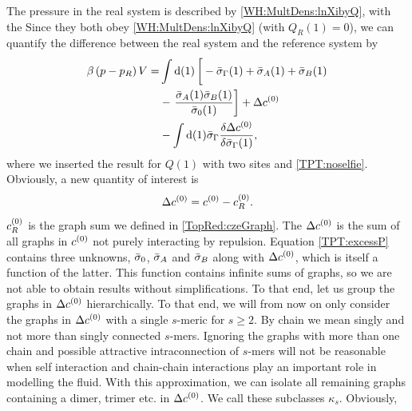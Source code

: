 \documentclass[8.5pt,twoside,twocolumn]{article}
\newcommand\di{\te{d}}
\newcommand\cze{\enmat{c^{(0)}}}
\newcommand\inon{\enmat{\int\di(1)}}
\theoremstyle{standard}
\begin{document}
The pressure in the real system is described by \eqref{WH:MultDens:lnXibyQ}, with the  
Since they both obey \eqref{WH:MultDens:lnXibyQ} (with $Q_R(1)=0$), we can quantify the difference
between the real system and the reference system by
\begin{equation}
\begin{aligned}
\be \rb{p-p_R}V =& \inon \lt[\vphantom{\frac 1 2}-\siga(1)+\si_A(1)+\si_B(1)\rt.\\
&-\lt.\frac{\si_A(1)\si_B(1)}{\siz(1)}\rt] + \Dl\cze \\
&- \inon\siga\delti{\Dl\cze}{\siga(1)},
\end{aligned}
\label{TPT:excessP}
\end{equation}
where we inserted the result for $Q(1)$ with two sites and \eqref{TPT:noselfie}. Obviously, a new
quantity of interest is
\newcommand\chs{\enmat{\cze_{R}}}
\newcommand\dc{\enmat{\Dl\cze}}
\newcommand\dcs{\enmat{\dc[s]}}
\begin{equation}
\dc=\cze-\chs.
\end{equation}
$\chs$ is the graph sum we defined in \eqref{TopRed:czeGraph}. The $\Dl\cze$ is the sum of all
graphs in $\cze$ not purely interacting by repulsion. Equation \eqref{TPT:excessP} contains
three unknowns, $\bar\sigma_0$, $\bar\sigma_A$ and $\bar\sigma_B$ along with $\dc$, which is itself a function
of the latter. This function contains infinite sums of graphs, so we are not able to obtain
results without simplifications. To that end, let us group the graphs in $\dc$
hierarchically. To that end, we will from now on only consider the graphs in
$\dc$ with a single $s$-meric  for $s\ge2$. By chain we mean singly
and not more than singly connected $s$-mers. Ignoring the graphs with more than one
chain and possible attractive intraconnection of $s$-mers will not be reasonable
when self interaction and chain-chain interactions play an important role
in modelling the fluid. With this approximation, we can isolate all
remaining graphs containing a dimer, trimer etc. in $\dc$.
We call these subclasses $\kappa_s$. Obviously,
\end{document}

